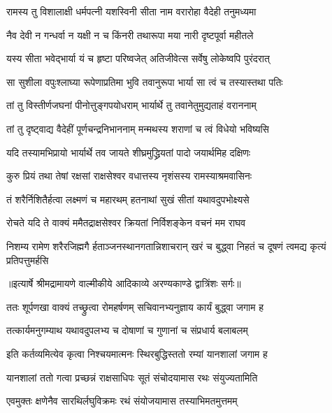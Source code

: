 \twolineshloka
{रामस्य तु विशालाक्षी धर्मपत्नी यशस्विनी}
{सीता नाम वरारोहा वैदेही तनुमध्यमा} %

\twolineshloka
{नैव देवी न गन्धर्वा न यक्षी न च किंनरी}
{तथारूपा मया नारी दृष्टपूर्वा महीतले} %

\twolineshloka
{यस्य सीता भवेद्भार्या यं च हृष्टा परिष्वजेत्}
{अतिजीवेत्स सर्वेषु लोकेष्वपि पुरंदरात्} %

\twolineshloka
{सा सुशीला वपुःश्लाघ्या रूपेणाप्रतिमा भुवि}
{तवानुरूपा भार्या सा त्वं च तस्यास्तथा पतिः} %

\twolineshloka
{तां तु विस्तीर्णजघनां पीनोत्तुङ्गपयोधराम्}
{भार्यार्थे तु तवानेतुमुद्यताहं वराननाम्} %

\twolineshloka
{तां तु दृष्ट्वाद्य वैदेहीं पूर्णचन्द्रनिभाननाम्}
{मन्मथस्य शराणां च त्वं विधेयो भविष्यसि} %

\twolineshloka
{यदि तस्यामभिप्रायो भार्यार्थे तव जायते}
{शीघ्रमुद्ध्रियतां पादो जयार्थमिह दक्षिणः} %

\twolineshloka
{कुरु प्रियं तथा तेषां रक्षसां राक्षसेश्वर}
{वधात्तस्य नृशंसस्य रामस्याश्रमवासिनः} %

\twolineshloka
{तं शरैर्निशितैर्हत्वा लक्ष्मणं च महारथम्}
{हतनाथां सुखं सीतां यथावदुपभोक्ष्यसे} %

\twolineshloka
{रोचते यदि ते वाक्यं ममैतद्राक्षसेश्वर}
{क्रियतां निर्विशङ्केन वचनं मम राघव} %

\fourlineindentedshloka
{निशम्य रामेण शरैरजिह्मगै}
{र्हताञ्जनस्थानगतान्निशाचरान्}
{खरं च बुद्ध्वा निहतं च दूषणं}
{ त्वमद्य कृत्यं प्रतिपत्तुमर्हसि} %


{॥इत्यार्षे श्रीमद्रामायणे वाल्मीकीये आदिकाव्ये अरण्यकाण्डे द्वात्रिंशः सर्गः॥}


\twolineshloka
{ततः शूर्पणखा वाक्यं तच्छ्रुत्वा रोमहर्षणम्}
{सचिवानभ्यनुज्ञाय कार्यं बुद्ध्वा जगाम ह} %

\twolineshloka
{तत्कार्यमनुगम्याथ यथावदुपलभ्य च}
{दोषाणां च गुणानां च संप्रधार्य बलाबलम्} %

\twolineshloka
{इति कर्तव्यमित्येव कृत्वा निश्चयमात्मनः}
{स्थिरबुद्धिस्ततो रम्यां यानशालां जगाम ह} %

\twolineshloka
{यानशालां ततो गत्वा प्रच्छन्नं राक्षसाधिपः}
{सूतं संचोदयामास रथः संयुज्यतामिति} %

\twolineshloka
{एवमुक्तः क्षणेनैव सारथिर्लघुविक्रमः}
{रथं संयोजयामास तस्याभिमतमुत्तमम्} %

